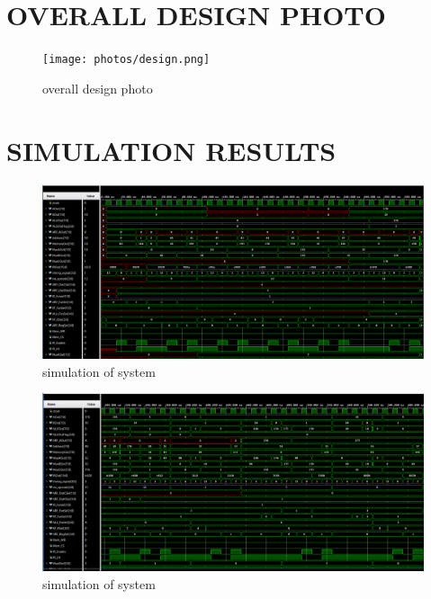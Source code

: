 \documentclass[pdftex,12pt,a4paper]{article}
\begin{document}
\section{OVERALL DESIGN PHOTO}


\begin{figure}[H]
    \centering
    \texttt{[image: photos/design.png]}	
    \caption{overall design photo}
    \label{implementation}
\end{figure}








\section{SIMULATION RESULTS}


\begin{figure}[H]
    \centering
    \includegraphics[width=1\textwidth]{photos/system_result_1.png}	
    \caption{simulation of system}
    \label{implementation}
\end{figure}


\begin{figure}[H]
    \centering
    \includegraphics[width=1\textwidth]{photos/system_result_2.png}	
    \caption{simulation of system}
    \label{implementation}
\end{figure}
\end{document}
